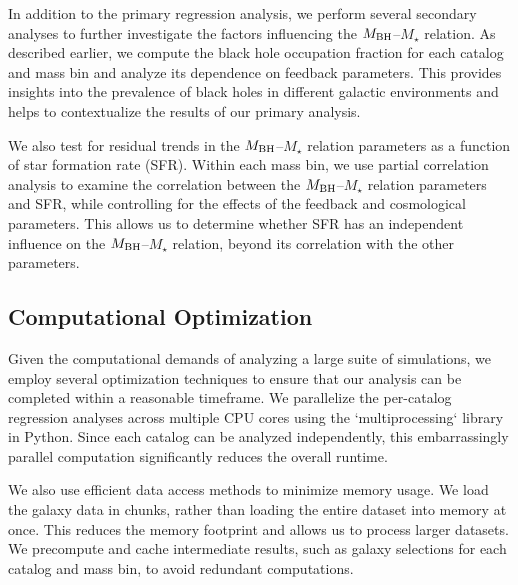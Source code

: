 \documentclass[twocolumn]{aastex631}
\begin{document}
In addition to the primary regression analysis, we perform several secondary analyses to further investigate the factors influencing the $M_{\rm BH}$--$M_{\star}$ relation. As described earlier, we compute the black hole occupation fraction for each catalog and mass bin and analyze its dependence on feedback parameters. This provides insights into the prevalence of black holes in different galactic environments and helps to contextualize the results of our primary analysis.

We also test for residual trends in the $M_{\rm BH}$--$M_{\star}$ relation parameters as a function of star formation rate (SFR). Within each mass bin, we use partial correlation analysis to examine the correlation between the $M_{\rm BH}$--$M_{\star}$ relation parameters and SFR, while controlling for the effects of the feedback and cosmological parameters. This allows us to determine whether SFR has an independent influence on the $M_{\rm BH}$--$M_{\star}$ relation, beyond its correlation with the other parameters.

\subsection{Computational Optimization}

Given the computational demands of analyzing a large suite of simulations, we employ several optimization techniques to ensure that our analysis can be completed within a reasonable timeframe. We parallelize the per-catalog regression analyses across multiple CPU cores using the `multiprocessing` library in Python. Since each catalog can be analyzed independently, this embarrassingly parallel computation significantly reduces the overall runtime.

We also use efficient data access methods to minimize memory usage. We load the galaxy data in chunks, rather than loading the entire dataset into memory at once. This reduces the memory footprint and allows us to process larger datasets. We precompute and cache intermediate results, such as galaxy selections for each catalog and mass bin, to avoid redundant computations.
\end{document}
